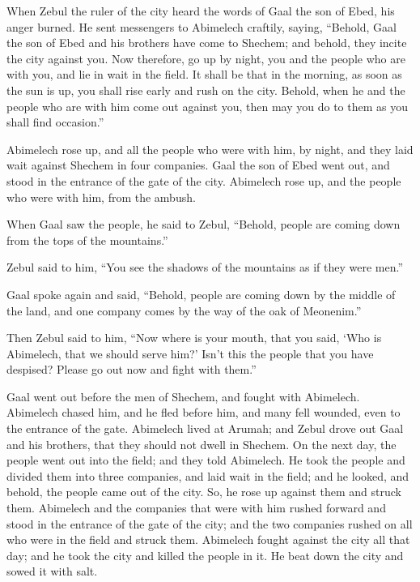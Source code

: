 \myverse{}When Zebul the ruler of the city heard the words of Gaal the
son of Ebed, his anger burned.
\myverse{}He sent messengers to Abimelech craftily, saying, “Behold, Gaal the son of
Ebed and his brothers have come to Shechem; and behold, they incite the city against you.
\myverse{}Now therefore, go up by night, you and the people who are with you, and lie
in wait in the field.
\myverse{}It shall be that in the morning, as soon as the sun is up, you shall rise
early and rush on the city. Behold, when he and the people who are with him come out against you, then
may you do to them as you shall find occasion.”

\myverse{}Abimelech rose up, and all the people who were with him, by night,
and they laid wait against Shechem in four companies.
\myverse{}Gaal the son of Ebed went out, and stood in the entrance of the gate of the
city. Abimelech rose up, and the people who were with him, from the ambush.

\myverse{}When Gaal saw the people, he said to Zebul, “Behold, people are
coming down from the tops of the mountains.”

Zebul said to him, “You see the shadows of the mountains as if they were men.”

\myverse{}Gaal spoke again and said, “Behold, people are coming down by
the middle of the land, and one company comes by the way of the oak of Meonenim.”

\myverse{}Then Zebul said to him, “Now where is your mouth, that you said,
‘Who is Abimelech, that we should serve him?’ Isn’t this the people that you have despised? Please go
out now and fight with them.”

\myverse{}Gaal went out before the men of Shechem, and fought with Abimelech.
\myverse{}Abimelech chased him, and he fled before him, and many fell wounded, even
to the entrance of the gate.
\myverse{}Abimelech lived at Arumah; and Zebul drove out Gaal and his brothers, that
they should not dwell in Shechem.
\myverse{}On the next day, the people went out into the field; and they told Abimelech.
\myverse{}He took the people and divided them into three companies, and laid wait in
the field; and he looked, and behold, the people came out of the city. So, he rose up against them and
struck them.
\myverse{}Abimelech and the companies that were with him rushed forward and stood in
the entrance of the gate of the city; and the two companies rushed on all who were in the field and struck
them.
\myverse{}Abimelech fought against the city all that day; and he took the city and killed
the people in it. He beat down the city and sowed it with salt.

